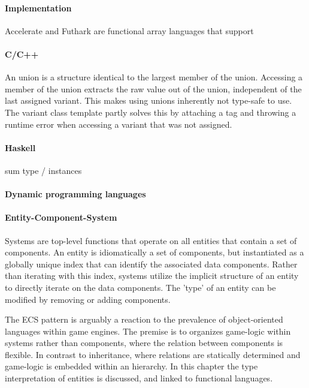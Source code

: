 \documentclass{article}
\begin{document}
\paragraph{Implementation}

Accelerate\cite{accelerate-sum-types} and Futhark\cite{futhark-sum-types} are functional array languages that support 

\paragraph{C/C++}

An union is a structure identical to the largest member of the union.
Accessing a member of the union extracts the raw value out of the union, independent of the last assigned variant.
This makes using unions inherently not type-safe to use.
The variant class template partly solves this by attaching a tag and throwing a runtime error when accessing a variant that was not assigned.

\paragraph{Haskell}

sum type / instances

\paragraph{Dynamic programming languages}

\paragraph{Entity-Component-System}

Systems are top-level functions that operate on all entities that contain a set of components. 
An entity is idiomatically a set of components, but instantiated as a globally unique index that can identify the associated data components.
Rather than iterating with this index, systems utilize the implicit structure of an entity to directly iterate on the data components.  
The 'type' of an entity can be modified by removing or adding components.

The ECS pattern is arguably a reaction to the prevalence of object-oriented languages within game engines.
The premise is to organizes game-logic within systems rather than components, where the relation between components is flexible\cite{ecs-origin}.
In contrast to inheritance, where relations are statically determined and game-logic is embedded within an hierarchy.
In this chapter the type interpretation of entities is discussed, and linked to functional languages.
\end{document}
